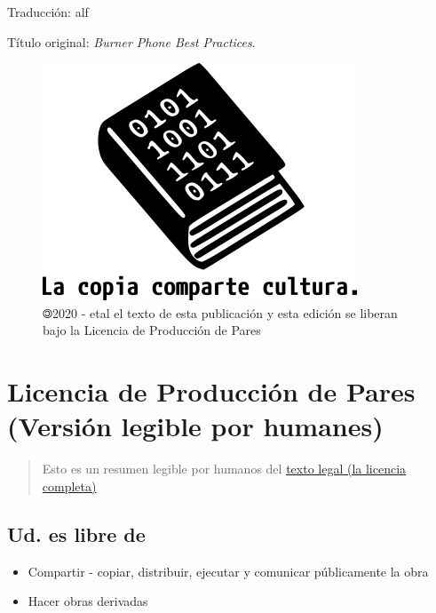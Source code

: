 \documentclass[
]{book}
\providecommand{\tightlist}{%
  \setlength{\itemsep}{0pt}\setlength{\parskip}{0pt}}
\begin{document}
Traducción: alf

Título original: \emph{Burner Phone Best Practices}.

\begin{figure}
\centering
\includegraphics{images/lccc.png}
\caption{🄯2020 - etal
el texto de esta publicación y esta edición se liberan bajo la Licencia de
Producción de Pares}
\end{figure}

\hypertarget{licencia-de-producciuxf3n-de-pares-versiuxf3n-legible-por-humanes}{%
\chapter*{Licencia de Producción de Pares (Versión legible por humanes)}\label{licencia-de-producciuxf3n-de-pares-versiuxf3n-legible-por-humanes}}

\begin{quote}
Esto es un resumen legible por humanos del \href{http://endefensadelsl.org/ppl_es.html}{texto legal (la licencia
completa)}
\end{quote}

\hypertarget{ud.-es-libre-de}{%
\section*{Ud. es libre de}\label{ud.-es-libre-de}}

\begin{itemize}
\tightlist
\item
  Compartir - copiar, distribuir, ejecutar y comunicar públicamente la obra
\item
  Hacer obras derivadas
\end{itemize}
\end{document}
